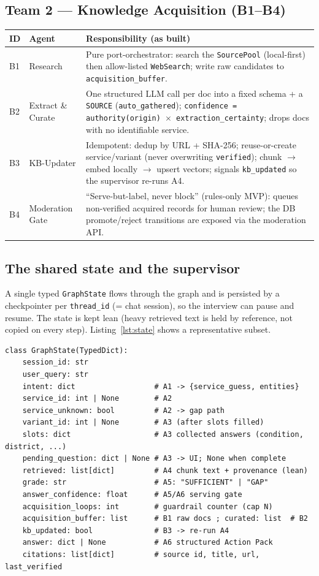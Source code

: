 \documentclass[11pt,a4paper]{article}
\begin{document}
\subsection{Team 2 --- Knowledge Acquisition (B1--B4)}
\begin{center}
\begin{tabularx}{\linewidth}{@{}l l Y@{}}
\toprule
\textbf{ID} & \textbf{Agent} & \textbf{Responsibility (as built)} \\
\midrule
B1 & Research & Pure port-orchestrator: search the \texttt{SourcePool} (local-first) then
allow-listed \texttt{WebSearch}; write raw candidates to \texttt{acquisition\_buffer}. \\
B2 & Extract \& Curate & One structured LLM call per doc into a fixed schema + a \texttt{SOURCE}
(\texttt{auto\_gathered}); \texttt{confidence = authority(origin) $\times$ extraction\_certainty};
drops docs with no identifiable service. \\
B3 & KB-Updater & Idempotent: dedup by URL + SHA-256; reuse-or-create service/variant (never
overwriting \texttt{verified}); chunk $\to$ embed locally $\to$ upsert vectors; signals
\texttt{kb\_updated} so the supervisor re-runs A4. \\
B4 & Moderation Gate & ``Serve-but-label, never block'' (rules-only MVP): queues non-verified acquired
records for human review; the DB promote/reject transitions are exposed via the moderation API. \\
\bottomrule
\end{tabularx}
\end{center}

\subsection{The shared state and the supervisor}
A single typed \texttt{GraphState} flows through the graph and is persisted by a checkpointer per
\texttt{thread\_id} (= chat session), so the interview can pause and resume. The state is kept lean
(heavy retrieved text is held by reference, not copied on every step). Listing~\ref{lst:state} shows a
representative subset.

\begin{lstlisting}[caption={The Blackboard state (abbreviated).},label={lst:state}]
class GraphState(TypedDict):
    session_id: str
    user_query: str
    intent: dict                  # A1 -> {service_guess, entities}
    service_id: int | None        # A2
    service_unknown: bool         # A2 -> gap path
    variant_id: int | None        # A3 (after slots filled)
    slots: dict                   # A3 collected answers (condition, district, ...)
    pending_question: dict | None # A3 -> UI; None when complete
    retrieved: list[dict]         # A4 chunk text + provenance (lean)
    grade: str                    # A5: "SUFFICIENT" | "GAP"
    answer_confidence: float      # A5/A6 serving gate
    acquisition_loops: int        # guardrail counter (cap N)
    acquisition_buffer: list      # B1 raw docs ; curated: list  # B2
    kb_updated: bool              # B3 -> re-run A4
    answer: dict | None           # A6 structured Action Pack
    citations: list[dict]         # source id, title, url, last_verified
\end{lstlisting}
\end{document}
